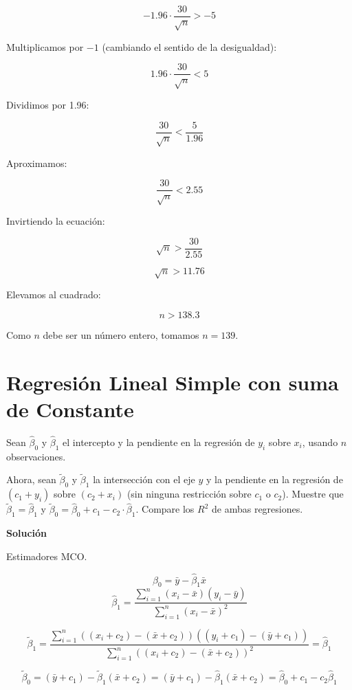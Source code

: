 \documentclass[10pt,a4paper]{article}
\begin{document}
\begin{equation}
- 1.96 \cdot \frac{30}{\sqrt{n}} > -5
\end{equation}

Multiplicamos por $-1$ (cambiando el sentido de la desigualdad):

\begin{equation}
1.96 \cdot \frac{30}{\sqrt{n}} < 5
\end{equation}

Dividimos por 1.96:

\begin{equation}
\frac{30}{\sqrt{n}} < \frac{5}{1.96}
\end{equation}

Aproximamos:

\begin{equation}
\frac{30}{\sqrt{n}} < 2.55
\end{equation}

Invirtiendo la ecuación:

\begin{equation}
\sqrt{n} > \frac{30}{2.55}
\end{equation}

\begin{equation}
\sqrt{n} > 11.76
\end{equation}

Elevamos al cuadrado:

\begin{equation}
n > 138.3
\end{equation}

Como $n$ debe ser un número entero, tomamos $n = 139$.

\section{Regresión Lineal Simple con suma de Constante}

Sean \(\hat{\beta}_0\) y \(\hat{\beta}_1\) el intercepto y la pendiente en la regresión de \(y_i\) sobre \(x_i\), usando \(n\) observaciones.

Ahora, sean \(\tilde{\beta}_0\) y \(\tilde{\beta}_1\) la intersección con el eje \(y\) y la pendiente en la regresión de \((c_1 + y_i)\) sobre \((c_2 + x_i)\) (sin ninguna restricción sobre \(c_1\) o \(c_2\)). Muestre que \(\tilde{\beta}_1 = \hat{\beta}_1\) y \(\tilde{\beta}_0 = \hat{\beta}_0 +c_1- c_2 \cdot \hat{\beta}_1\). Compare los $R^2$ de ambas regresiones.

\textbf{Solución}
{ Estimadores MCO.

$$\hat{\beta}_0 = \bar{y} - \hat{\beta}_1 \bar{x} $$
$$\hat{\beta}_1 = \frac{\sum_{i=1}^{n}(x_i - \bar{x})(y_i-\bar{y})}{\sum_{i=1}^{n}(x_i - \bar{x})^2}$$


$$\tilde{\beta}_1 = \frac{\sum_{i=1}^{n}((x_i+c_2) - (\bar{x}+c_2))((y_i+c_1)-(\bar{y}+c_1))}{\sum_{i=1}^{n}((x_i+c_2) - (\bar{x}+c_2))^2}=\hat{\beta}_1$$

$$\tilde{\beta}_0 = (\bar{y}+c_1) - \tilde{\beta}_1 (\bar{x}+c_2)= (\bar{y}+c_1) - \hat{\beta}_1 (\bar{x}+c_2)=\hat{\beta}_0+c_1-c_2\hat{\beta}_1  $$
}
\end{document}
